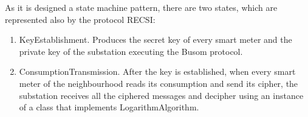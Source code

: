 
As it is designed a state machine pattern, there are two states, which are represented also by the protocol RECSI:
\begin{enumerate}
	\item KeyEstablishment. Produces the secret key of every smart meter and the private key of the substation executing the Busom protocol.
	\item ConsumptionTransmission. After the key is established, when every smart meter of the neighbourhood reads its consumption and send its cipher, the substation receives all the ciphered messages and decipher using an instance of a class that implements LogarithmAlgorithm.
\end{enumerate}
